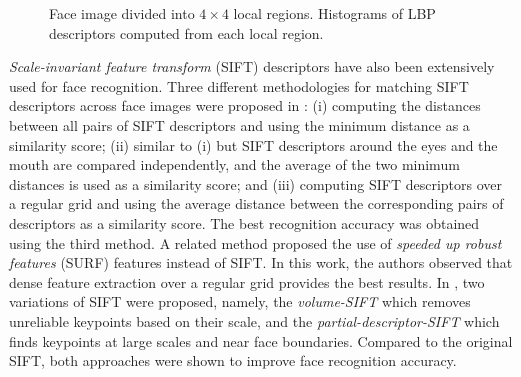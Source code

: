 \documentclass[conference]{IEEEtran}
\begin{document}
\begin{figure}[tb]
    \centering
    \caption{ Face image divided into $4 \times 4$ local regions.  Histograms of LBP descriptors computed from each local region.}
    \label{fig:lbp_representation}
\end{figure}

\textit{Scale-invariant feature transform} (SIFT) descriptors \cite{lowe1999object} have also been extensively used for face recognition. Three different methodologies for matching SIFT descriptors across face images were proposed in \cite{bicego2006use}: (i) computing the distances between all pairs of SIFT descriptors and using the minimum distance as a similarity score; (ii) similar to (i) but SIFT descriptors around the eyes and the mouth are compared independently, and the average of the two minimum distances is used as a similarity score; and (iii) computing SIFT descriptors over a regular grid and using the average distance between the corresponding pairs of descriptors as a similarity score. The best recognition accuracy was obtained using the third method. A related method \cite{dreuw2009surf} proposed the use of \textit{speeded up robust features} (SURF) \cite{bay2006surf} features instead of SIFT. In this work, the authors observed that dense feature extraction over a regular grid provides the best results. In \cite{geng2009face}, two variations of SIFT were proposed, namely, the \textit{volume-SIFT} which removes unreliable keypoints based on their scale, and the \textit{partial-descriptor-SIFT} which finds keypoints at large scales and near face boundaries. Compared to the original SIFT, both approaches were shown to improve face recognition accuracy.
\end{document}

